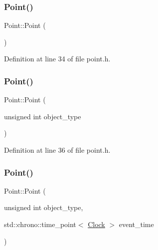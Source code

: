 \subsubsection{\texorpdfstring{Point()}{Point()}\hspace{0.1cm}{\footnotesize\ttfamily [1/4]}}
{\footnotesize\ttfamily Point\+::\+Point (\begin{DoxyParamCaption}{ }\end{DoxyParamCaption})\hspace{0.3cm}{\ttfamily [inline]}}



Definition at line 34 of file point.\+h.

\mbox{\label{class_point_a84d29a0f72e67406901cb87c1d2f77e9}} 
\subsubsection{\texorpdfstring{Point()}{Point()}\hspace{0.1cm}{\footnotesize\ttfamily [2/4]}}
{\footnotesize\ttfamily Point\+::\+Point (\begin{DoxyParamCaption}\item[{unsigned int}]{object\+\_\+type }\end{DoxyParamCaption})\hspace{0.3cm}{\ttfamily [inline]}}



Definition at line 36 of file point.\+h.

\mbox{\label{class_point_ac3e6d30951c40e5bc5dafe6c90668b3f}} 
\subsubsection{\texorpdfstring{Point()}{Point()}\hspace{0.1cm}{\footnotesize\ttfamily [3/4]}}
{\footnotesize\ttfamily Point\+::\+Point (\begin{DoxyParamCaption}\item[{unsigned int}]{object\+\_\+type,  }\item[{std\+::chrono\+::time\+\_\+point$<$ \mbox{\hyperlink{universe_8h_a0ef8d951d1ca5ab3cfaf7ab4c7a6fd80}{Clock}} $>$}]{event\+\_\+time }\end{DoxyParamCaption})\hspace{0.3cm}{\ttfamily [inline]}}



